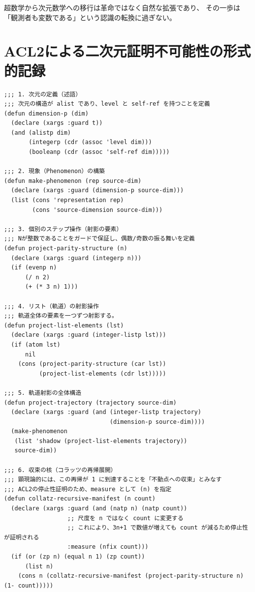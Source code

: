 \documentclass[11pt,a4paper]{article}
\theoremstyle{definition}
\begin{document}
超数学から次元数学への移行は革命ではなく自然な拡張であり、
その一歩は「観測者も変数である」という認識の転換に過ぎない。

\appendix

\section{ACL2による二次元証明不可能性の形式的記録}

\begin{lstlisting}[caption={停止性の外部依存：二次元限界の形式的記録}]
;;; 1. 次元の定義（述語）
;;; 次元の構造が alist であり、level と self-ref を持つことを定義
(defun dimension-p (dim)
  (declare (xargs :guard t))
  (and (alistp dim)
       (integerp (cdr (assoc 'level dim)))
       (booleanp (cdr (assoc 'self-ref dim)))))

;;; 2. 現象（Phenomenon）の構築
(defun make-phenomenon (rep source-dim)
  (declare (xargs :guard (dimension-p source-dim)))
  (list (cons 'representation rep)
        (cons 'source-dimension source-dim)))

;;; 3. 個別のステップ操作（射影の要素）
;;; Nが整数であることをガードで保証し、偶数/奇数の振る舞いを定義
(defun project-parity-structure (n)
  (declare (xargs :guard (integerp n)))
  (if (evenp n)
      (/ n 2)
      (+ (* 3 n) 1)))

;;; 4. リスト（軌道）の射影操作
;;; 軌道全体の要素を一つずつ射影する。
(defun project-list-elements (lst)
  (declare (xargs :guard (integer-listp lst)))
  (if (atom lst)
      nil
    (cons (project-parity-structure (car lst))
          (project-list-elements (cdr lst)))))

;;; 5. 軌道射影の全体構造
(defun project-trajectory (trajectory source-dim)
  (declare (xargs :guard (and (integer-listp trajectory)
                              (dimension-p source-dim))))
  (make-phenomenon
   (list 'shadow (project-list-elements trajectory))
   source-dim))

;;; 6. 収束の核（コラッツの再帰展開）
;;; 顕現論的には、この再帰が 1 に到達することを「不動点への収束」とみなす
;;; ACL2の停止性証明のため、measure として (n) を指定
(defun collatz-recursive-manifest (n count)
  (declare (xargs :guard (and (natp n) (natp count))
                  ;; 尺度を n ではなく count に変更する
                  ;; これにより、3n+1 で数値が増えても count が減るため停止性が証明される
                  :measure (nfix count))) 
  (if (or (zp n) (equal n 1) (zp count))
      (list n)
    (cons n (collatz-recursive-manifest (project-parity-structure n) (1- count)))))



\end{lstlisting}
\end{document}
